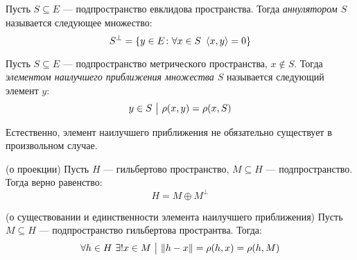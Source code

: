 \begin{definition}
	Пусть $S \subseteq E$ --- подпространство евклидова пространства. Тогда \textit{аннулятором $S$} называется следующее множество:
	\[
		S^\bot = \{y \in E \colon \forall x \in S\ \left\langle x, y\right\rangle = 0\}
	\]
\end{definition}

\begin{definition}
	Пусть $S \subseteq E$ --- подпространство метрического пространства, $x \notin S$. Тогда \textit{элементом наилучшего приближения множества $S$} называется следующий элемент $y$:
	\[
		y \in S \ \big|\  \rho(x, y) = \rho(x, S)
	\]
\end{definition}

\begin{note}
	Естественно, элемент наилучшего приближения не обязательно существует в произвольном случае.
\end{note}

\begin{theorem} (о проекции)
	Пусть $H$ --- гильбертово пространство, $M \subseteq H$ --- подпространство. Тогда верно равенство:
	\[
		H = M \oplus M^\bot
	\]
\end{theorem}

\begin{lemma} (о существовании и единственности элемента наилучшего приближения)
	Пусть $M \subseteq H$ --- подпространство гильбертова пространтва. Тогда:
	\[
		\forall h \in H\ \exists! x \in M \ \big|\  \|h - x\| = \rho(h, x) = \rho(h, M)
	\]
\end{lemma}

